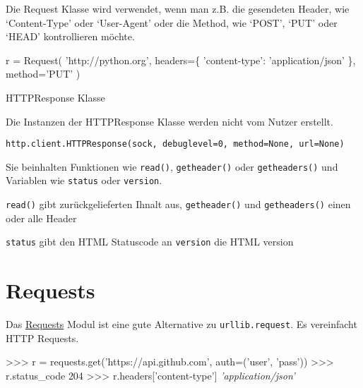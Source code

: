 \documentclass[ignorenonframetext,]{beamer}
\newenvironment{Shaded}{}{}
\newcommand{\DecValTok}[1]{\textcolor[rgb]{0.25,0.63,0.44}{{#1}}}
\newcommand{\StringTok}[1]{\textcolor[rgb]{0.25,0.44,0.63}{{#1}}}
\newcommand{\CommentTok}[1]{\textcolor[rgb]{0.38,0.63,0.69}{\textit{{#1}}}}
\newcommand{\OperatorTok}[1]{\textcolor[rgb]{0.40,0.40,0.40}{{#1}}}
\newcommand{\NormalTok}[1]{{#1}}
\begin{document}
\begin{frame}[fragile]

Die Request Klasse wird verwendet, wenn man z.B. die gesendeten Header,
wie `Content-Type' oder `User-Agent' oder die Method, wie `POST', `PUT'
oder `HEAD' kontrollieren möchte.

\begin{Shaded}
\begin{Highlighting}[]
\NormalTok{r }\OperatorTok{=} \NormalTok{Request(}
    \StringTok{'http://python.org'}\NormalTok{,}
    \NormalTok{headers}\OperatorTok{=}\NormalTok{\{ }\StringTok{'content-type'}\NormalTok{: }\StringTok{'application/json'} \NormalTok{\},}
    \NormalTok{method}\OperatorTok{=}\StringTok{'PUT'}
\NormalTok{)}
\end{Highlighting}
\end{Shaded}

\end{frame}

\begin{frame}[fragile]{HTTPResponse Klasse}

Die Instanzen der HTTPResponse Klasse werden nicht vom Nutzer erstellt.

\begin{verbatim}
http.client.HTTPResponse(sock, debuglevel=0, method=None, url=None)
\end{verbatim}

Sie beinhalten Funktionen wie \texttt{read()}, \texttt{getheader()} oder
\texttt{getheaders()} und Variablen wie \texttt{status} oder
\texttt{version}.

\texttt{read()} gibt zurückgelieferten Ihnalt aus, \texttt{getheader()}
und \texttt{getheaders()} einen oder alle Header

\texttt{status} gibt den HTML Statuscode an \texttt{version} die HTML
version

\end{frame}

\section{Requests}\label{requests}

\begin{frame}[fragile]

Das \href{https://github.com/kennethreitz/requests}{Requests} Modul ist
eine gute Alternative zu \texttt{urllib.request}. Es vereinfacht HTTP
Requests.

\begin{Shaded}
\begin{Highlighting}[]
\OperatorTok{>>>} \NormalTok{r }\OperatorTok{=} \NormalTok{requests.get(}\StringTok{'https://api.github.com'}\NormalTok{, auth}\OperatorTok{=}\NormalTok{(}\StringTok{'user'}\NormalTok{, }\StringTok{'pass'}\NormalTok{))}
\OperatorTok{>>>} \NormalTok{r.status_code}
\DecValTok{204}
\OperatorTok{>>>} \NormalTok{r.headers[}\StringTok{'content-type'}\NormalTok{]}
\CommentTok{'application/json'}
\end{Highlighting}
\end{Shaded}

\end{frame}
\end{document}
